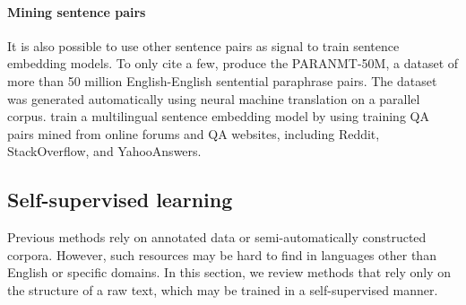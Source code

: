 \paragraph{Mining sentence pairs} 

It is also possible to use other sentence pairs as signal to train sentence embedding models. To only cite a few, \textcite{gimpel_18} produce the PARANMT-50M, a dataset of more than 50 million English-English sentential paraphrase pairs. The dataset was generated automatically using neural machine translation on a parallel corpus. \textcite{yang_20} train a multilingual sentence embedding model by using training QA pairs mined from online forums and QA websites, including Reddit, StackOverflow, and YahooAnswers.


\subsection{Self-supervised learning}

Previous methods rely on annotated data or semi-automatically constructed corpora. However, such resources may be hard to find in languages other than English or specific domains. In this section, we review methods that rely only on the structure of a raw text, which may be trained in a self-supervised manner. 

